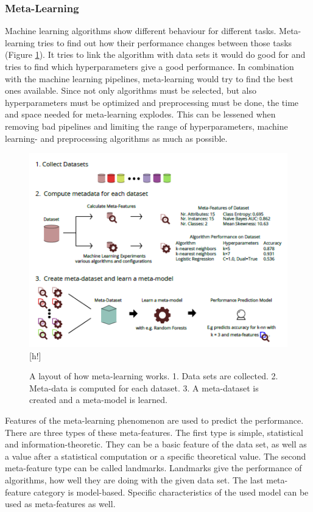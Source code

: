 \documentclass[10pt,a4paper]{article}
\begin{document}
	
	\subsubsection{Meta-Learning}
	\label{subsubsec:Meta-Learning}
	
	Machine learning algorithms show different behaviour for different tasks. Meta-learning tries to find out how their performance changes between those tasks (Figure \ref{fig:Meta-LearningLayout}). It tries to link the algorithm with data sets it would do good for and tries to find which hyperparameters give a good performance. In combination with the machine learning pipelines, meta-learning would try to find the best ones available. Since not only algorithms must be selected, but also hyperparameters must be optimized and preprocessing must be done, the time and space needed for meta-learning explodes. This can be lessened when removing bad pipelines and limiting the range of hyperparameters, machine learning- and preprocessing algorithms as much as possible. 

	\begin{figure}
		\label{fig:Meta-LearningLayout}
		\includegraphics[scale=1]{Meta-LearningLayout.png}[h!]
		\caption{A layout of how meta-learning works. 1. Data sets are collected. 2. Meta-data is computed for each dataset. 3. A meta-dataset is created and a meta-model is learned.\cite{Gijsbers2017Thesis}}
	\end{figure}
	
	Features of the meta-learning phenomenon are used to predict the performance. There are three types of these meta-features. The first type is simple, statistical and information-theoretic. They can be a basic feature of the data set, as well as a value after a statistical computation or a specific theoretical value. The second meta-feature type can be called landmarks. Landmarks give the performance of algorithms, how well they are doing with the given data set. The last meta-feature category is model-based. Specific characteristics of the used model can be used as meta-features as well.\cite{brazdil1994characterizing, vilalta2004using}
\end{document}
